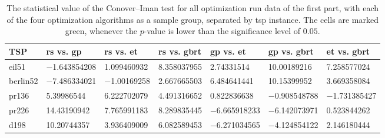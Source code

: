 \begin{table}[h]
	\centering
	\caption[The $p$-value of the Conover–Iman test for all optimization run data of the first part]{The statistical value of the Conover–Iman test for all optimization run data of the first part, with each of the four optimization algorithms as a sample group, separated by \gls{tsp} instance. The cells are marked green, whenever the $p$-value is lower than the significance level of $0.05$.}
	\label{tab:conover-t}
	
	\begin{adjustbox}{width=1\textwidth}
	\begin{tabular}{ l | l | l | l | l | l | l}
		TSP & \gls{rs} vs. \gls{gp} & \gls{rs} vs. \gls{et} & \gls{rs} vs. \gls{gbrt} & \gls{gp} vs. \gls{et} & \gls{gp} vs. \gls{gbrt} & \gls{et} vs. \gls{gbrt} \\ \hline
		eil51 & \num{-1,643854208} & \num{1,099460932} & \cellcolor{green!25} \num{8,358037955} & \cellcolor{green!25} \num{2,74331514} & \cellcolor{green!25} \num{10,00189216} & \cellcolor{green!25} \num{7,258577024} \\ \hline
		berlin52 & \cellcolor{green!25} \num{-7,486334021} & \num{-1,00169258} & \num{2,667665503} & \cellcolor{green!25} \num{6,484641441} & \cellcolor{green!25} \num{10,15399952} & \cellcolor{green!25} \num{3,669358084} \\ \hline
		pr136 & \cellcolor{green!25} \num{5,39986544} & \cellcolor{green!25} \num{6,222702079} & \cellcolor{green!25} \num{4,491316652} & \num{0,822836638} & \num{-0,908548788} & \num{-1,731385427} \\ \hline
    	pr226 & \cellcolor{green!25} \num{14,43190942} & \cellcolor{green!25} \num{7,765991183} & \cellcolor{green!25} \num{8,289835445} & \cellcolor{green!25} \num{-6,665918233} & \cellcolor{green!25} \num{-6,142073971} & \num{0,523844262} \\ \hline
    	d198 & \cellcolor{green!25} \num{10,20744357} & \cellcolor{green!25} \num{3,936409009} & \cellcolor{green!25} \num{6,082589453} & \cellcolor{green!25} \num{-6,271034565} & \cellcolor{green!25} \num{-4,124854122} & \num{2,146180444} \\ 
	\end{tabular}
	\end{adjustbox}
\end{table}

